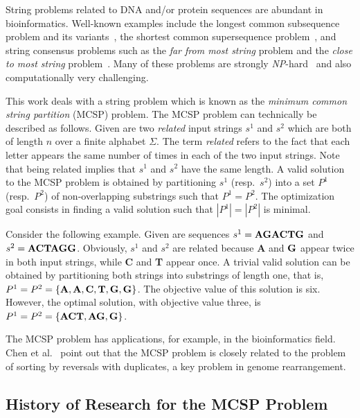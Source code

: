 \documentclass[11pt,a4paper]{article}
\begin{document}
String problems related to DNA and/or protein sequences are abundant in
bioinformatics. Well-known examples include the longest common
subsequence problem and its variants~\cite{HsuDu84lcs,SmiWat81:jmb}, the
shortest common supersequence problem~\cite{Gal2012:plosone}, and string
consensus problems such as the \emph{far from most string} problem and
the \emph{close to most string} problem~\cite{MouBabMon12a,MenOliPar05}.
Many of these problems are strongly \emph{NP}-hard~\cite{GJ79} and also computationally
very challenging.

This work deals with a string problem which is known as the \emph{minimum common string partition} (MCSP) problem. The MCSP problem can technically be described as follows. Given are two \emph{related} input strings $s^1$ and $s^2$ which are both of length $n$ over a finite alphabet $\Sigma$. The term \emph{related} refers to the fact that each letter appears the same number of times in each of the two input strings. Note that being related implies that $s^1$ and $s^2$ have the same length. A valid solution to the MCSP problem is obtained by partitioning $s^1$ (resp.~$s^2$) into a set $P^1$ (resp.~$P^2$) of non-overlapping substrings such that $P^1 = P^2$. The optimization goal consists in finding a valid solution such that $|P^1| = |P^2|$ is minimal.

Consider the following example. Given are sequences $s^1 = \mbox{\bf
AGACTG}$ and $s^2 = \mbox{\bf ACTAGG}$. Obviously, $s^1$ and $s^2$ are
related because {\bf A} and ${\bf G}$ appear twice in both input
strings, while {\bf C} and {\bf T} appear once. A trivial valid solution
can be obtained by partitioning both strings into substrings of length
one, that is, $P^1 = P^2 = \{\mbox{\bf A}, \mbox{\bf A}, \mbox{\bf C},
\mbox{\bf T}, \mbox{\bf G}, \mbox{\bf G}\}$. The objective 
value of this solution is six. However, the optimal solution, with
objective value three, is $P^1 = P^2 = \{\mbox{\bf ACT}, \mbox{\bf AG}, \mbox{\bf G}\}$.

The MCSP problem has applications, for example, in the bioinformatics field. Chen et al.~\cite{CheEtAl05:journal} point out that the MCSP problem is closely related to the problem of sorting by reversals with duplicates, a key problem in genome rearrangement. 

\subsection{History of Research for the MCSP Problem}
\end{document}
